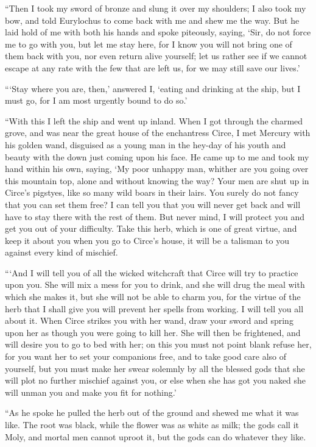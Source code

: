 “Then I took my sword of bronze and slung it over my shoulders; I also took my
bow, and told Eurylochus to come back with me and shew me the way. But he laid
hold of me with both his hands and spoke piteously, saying, ‘Sir, do not force
me to go with you, but let me stay here, for I know you will not bring one of
them back with you, nor even return alive yourself; let us rather see if we
cannot escape at any rate with the few that are left us, for we may still save
our lives.’

“‘Stay where you are, then,’ answered I, ‘eating and drinking at the ship, but
I must go, for I am most urgently bound to do so.’

“With this I left the ship and went up inland. When I got through the charmed
grove, and was near the great house of the enchantress Circe, I met Mercury
with his golden wand, disguised as a young man in the hey-day of his youth and
beauty with the down just coming upon his face. He came up to me and took my
hand within his own, saying, ‘My poor unhappy man, whither are you going over
this mountain top, alone and without knowing the way? Your men are shut up in
Circe’s pigstyes, like so many wild boars in their lairs. You surely do not
fancy that you can set them free? I can tell you that you will never get back
and will have to stay there with the rest of them. But never mind, I will
protect you and get you out of your difficulty. Take this herb, which is one of
great virtue, and keep it about you when you go to Circe’s house, it will be a
talisman to you against every kind of mischief.

“‘And I will tell you of all the wicked witchcraft that Circe will try to
practice upon you. She will mix a mess for you to drink, and she will drug the
meal with which she makes it, but she will not be able to charm you, for the
virtue of the herb that I shall give you will prevent her spells from working.
I will tell you all about it. When Circe strikes you with her wand, draw your
sword and spring upon her as though you were going to kill her. She will then
be frightened, and will desire you to go to bed with her; on this you must not
point blank refuse her, for you want her to set your companions free, and to
take good care also of yourself, but you must make her swear solemnly by all
the blessed gods that she will plot no further mischief against you, or else
when she has got you naked she will unman you and make you fit for nothing.’

“As he spoke he pulled the herb out of the ground and shewed me what it was
like. The root was black, while the flower was as white as milk; the gods call
it Moly, and mortal men cannot uproot it, but the gods can do whatever they
like.

